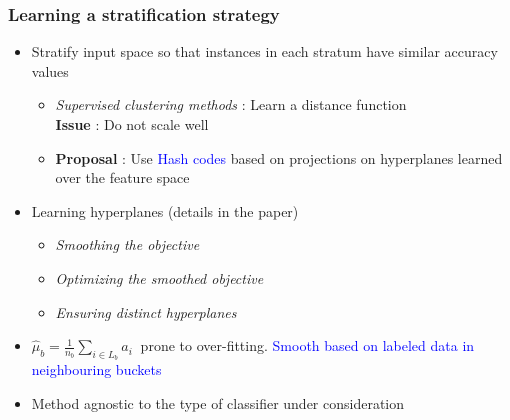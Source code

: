 \documentclass[usenames,dvipsnames, 11pt]{beamer}
\newcommand{\acc}{{a}}
\newcommand{\estSb}{{\mbox{$\hat{\mu}$}}}
\newlength{\wideitemsep}
\let\olditem\item
\renewcommand{\item}{\setlength{\itemsep}{\wideitemsep}\olditem}
\begin{document}
\begin{frame}
\frametitle{Learning a stratification strategy} %
\begin{itemize}
\pause
\item Stratify input space so that instances in each stratum have similar accuracy values
\pause
\begin{itemize}
\item \emph{Supervised clustering methods} : Learn a distance function \\ \textbf{Issue} : Do not scale well 
\item \textbf{Proposal} : Use \textcolor{blue}{Hash codes} based on projections on hyperplanes learned over the feature space
\end{itemize}
\pause
\item Learning hyperplanes (details in the paper)
\begin{itemize}
\item \emph{Smoothing the objective} %
\item \emph{Optimizing the smoothed objective} %
\item \emph{Ensuring distinct hyperplanes} %
\end{itemize}
\pause
\item $\estSb_b=\frac{1}{n_b}\sum_{i\in L_b}\acc_i~$ prone to over-fitting. \textcolor{blue}{Smooth based on labeled data in neighbouring buckets}
\pause
\item Method agnostic to the type of classifier under consideration
\end{itemize}
\end{frame}
\end{document}
